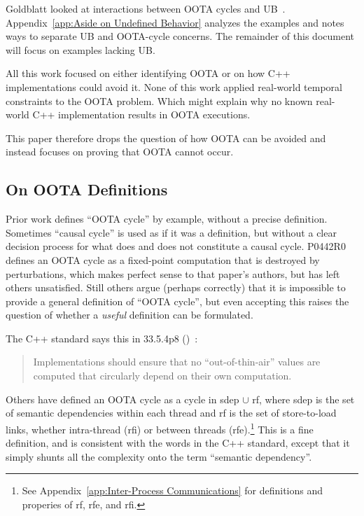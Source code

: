 \documentclass[10]{article}
\begin{document}
Goldblatt looked at interactions between OOTA cycles and
UB~\cite{DavidGoldblatt2019NoElegantOOTAfix}.
Appendix~\ref{app:Aside on Undefined Behavior}
analyzes the examples and notes ways to separate UB and OOTA-cycle
concerns.
The remainder of this document will focus on examples lacking UB.

All this work focused on either identifying OOTA or on how C++
implementations could avoid it.
None of this work applied real-world temporal constraints to the OOTA
problem.
Which might explain why no known real-world C++ implementation results
in OOTA executions.

This paper therefore drops the question of how OOTA can be avoided and
instead focuses on proving that OOTA cannot occur.

\subsection{On OOTA Definitions}
\label{sec:On OOTA Definitions}

Prior work defines ``OOTA cycle'' by example, without a precise
definition.
Sometimes ``causal cycle'' is used as if it was a definition, but
without a clear decision process for what does and does not
constitute a causal cycle.
P0442R0 defines an OOTA cycle as a fixed-point computation that is
destroyed by perturbations, which makes perfect sense to that paper's
authors, but has left others unsatisfied.
Still others argue (perhaps correctly) that it is impossible to provide
a general definition of ``OOTA cycle'', but even accepting this raises
the question of whether a \emph{useful} definition can be formulated.

The C++ standard says this in 33.5.4p8
()~\cite{ThomasKoeppe2023N4950}:

\begin{quote}
	Implementations should ensure that no “out-of-thin-air” values
	are computed that circularly depend on their own computation.
\end{quote}

Others have defined an OOTA cycle as a cycle in sdep $\cup$ rf, where
sdep is the set of semantic dependencies within each thread and rf is
the set of store-to-load links, whether intra-thread (rfi) or between
threads (rfe).\footnote{
	See Appendix~\ref{app:Inter-Process Communications} for definitions
	and properies of rf, rfe, and rfi.}
This is a fine definition, and is consistent with the words in the C++
standard, except that it simply shunts all the complexity onto the
term ``semantic dependency''.
\end{document}
